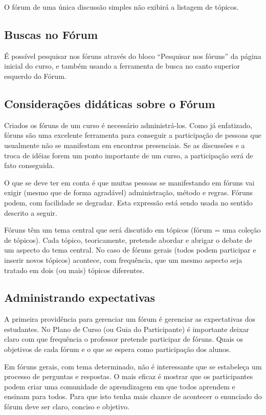 O fórum de uma única discussão simples não exibirá a listagem de tópicos.

\subsection{Buscas no Fórum}
É possível pesquisar nos fóruns através do bloco “Pesquisar nos fóruns” da página inicial do curso, e também usando a ferramenta de busca no canto superior esquerdo do Fórum.
\subsection{Considerações didáticas sobre o Fórum}

Criados os fóruns de um curso é necessário administrá-los. Como já enfatizado, fóruns são uma excelente ferramenta para conseguir a participação de pessoas que usualmente não se manifestam  em encontros presenciais. Se as discussões e a troca de idéias forem um ponto importante de um curso, a participação será de fato conseguida.

O que se deve ter em conta é que muitas pessoas se manifestando em fóruns vai exigir (mesmo que de forma agradável) administração, método e regras. Fóruns podem, com facilidade se degradar. Esta expressão está sendo usada no sentido descrito a seguir.

Fóruns têm um tema central que será discutido em tópicos (fórum = uma coleção de tópicos). Cada tópico, teoricamente, pretende abordar e abrigar o debate  de um aspecto do tema central. No caso de fóruns gerais (todos podem participar e inserir novos tópicos) acontece, com frequência, que um mesmo aspecto seja tratado em dois (ou mais) tópicos diferentes.

\subsection{Administrando expectativas}
A primeira providência para gerenciar um fórum é gerenciar as expectativas dos estudantes. No Plano de Curso (ou Guia do Participante) é importante deixar claro com que frequência o professor pretende participar de fóruns. Quais os objetivos de cada fórum e o que se espera como participação dos alunos.

Em fóruns gerais, com tema determinado, não é interessante que se estabeleça um processo de perguntas e respostas. O mais eficaz é mostrar que os participantes podem criar uma comunidade de aprendizagem  em que todos aprendem e ensinam para todos. Para que isto tenha mais chance de acontecer o enunciado do fórum deve ser claro, conciso e objetivo.

